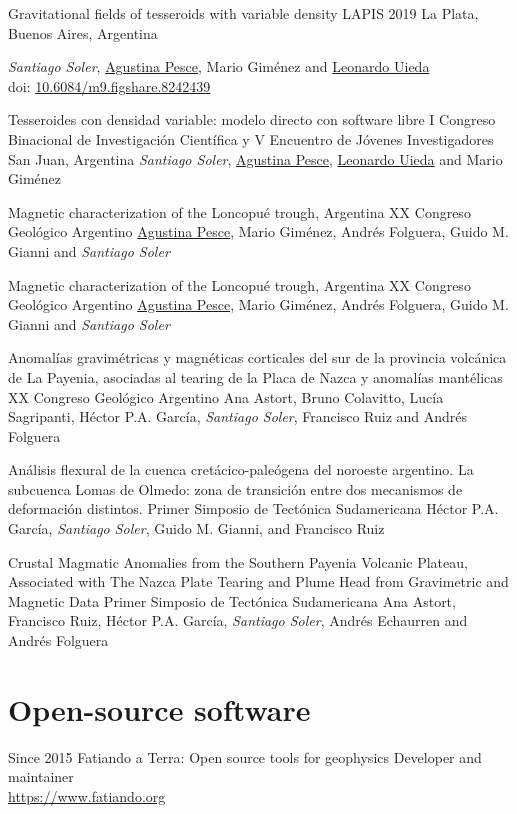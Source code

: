 \documentclass[a4paper,12pt]{moderncv}
\newcommand{\me}{\emph{Santiago Soler}}
\newcommand{\agustina}{\href{https://aguspesce.github.io}{Agustina Pesce}}
\newcommand{\guido}{Guido M. Gianni}
\newcommand{\leo}{\href{https://www.leouieda.com}{Leonardo Uieda}}
\newcommand{\mario}{Mario Giménez}
\newcommand{\folguera}{Andrés Folguera}
\newcommand{\pichu}{Héctor P.A. García}
\newcommand{\paco}{Francisco Ruiz}
\newcommand{\doi}[1]{
    \href{https://doi.org/#1}{#1}
}
\begin{document}
{Gravitational fields of tesseroids with variable density}
{LAPIS 2019}
{La Plata, Buenos Aires, Argentina}
{}
{
    \me{}, \agustina{}, \mario{} and \leo{}
    \\
    doi: \doi{10.6084/m9.figshare.8242439}
}

{Tesseroides con densidad variable: modelo directo con software libre}
{
    I Congreso Binacional de Investigación Científica y V Encuentro de Jóvenes
    Investigadores
}
{San Juan, Argentina}
{}
{\me{}, \agustina{}, \leo{} and \mario{}}

{Magnetic characterization of the Loncopué trough, Argentina}
{XX Congreso Geológico Argentino}
{}
{}
{\agustina{}, \mario{}, \folguera{}, \guido{} and \me{}}

{Magnetic characterization of the Loncopué trough, Argentina}
{XX Congreso Geológico Argentino}
{}
{}
{\agustina{}, \mario{}, \folguera{}, \guido{} and \me{}}

{
    Anomalías gravimétricas y magnéticas corticales del sur de la provincia
    volcánica de La Payenia, asociadas al tearing de la Placa de Nazca
    y anomalías mantélicas
}
{XX Congreso Geológico Argentino}
{}
{}
{
    Ana Astort, Bruno Colavitto, Lucía Sagripanti, \pichu{}, \me{}, \paco{}
    and \folguera{}
}

{
   Análisis flexural de la cuenca cretácico-paleógena del noroeste
   argentino. La subcuenca Lomas de Olmedo: zona de transición entre dos
   mecanismos de deformación distintos.
}
{Primer Simposio de Tectónica Sudamericana}
{}
{}
{\pichu{}, \me{}, \guido{}, and \paco{}}

{
    Crustal Magmatic Anomalies from the Southern Payenia Volcanic Plateau,
    Associated with The Nazca Plate Tearing and Plume Head from Gravimetric
    and Magnetic Data
}
{Primer Simposio de Tectónica Sudamericana}
{}
{}
{Ana Astort, \paco{}, \pichu{}, \me{}, Andrés Echaurren and \folguera{}}


\section{Open-source software}

\cventry
{Since 2015}
{Fatiando a Terra: Open source tools for geophysics}
{}
{}
{}
{
    Developer and maintainer
    \\
    \url{https://www.fatiando.org}
}
\end{document}
